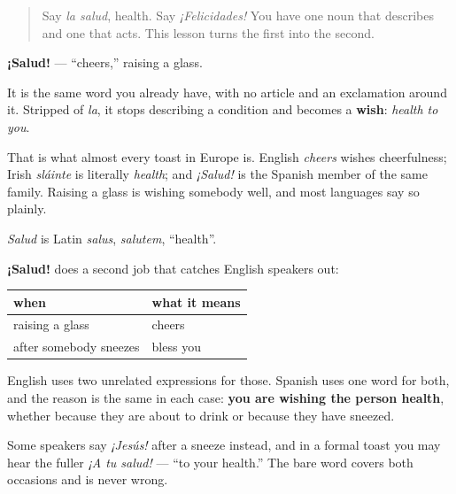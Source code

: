 \label{lesson:ES-C428-salud-brindis}



\begin{quote}
Say \emph{la salud}, health. Say \emph{¡Felicidades!} You have one noun that describes and one that acts. This lesson turns the first into the second.
\end{quote}

\begin{cousinweb}
\textbf{¡Salud!} — \textquotedblleft{}cheers,\textquotedblright{} raising a glass.

It is the same word you already have, with no article and an exclamation around it. Stripped of \emph{la}, it stops describing a condition and becomes a \textbf{wish}: \emph{health to you}.

That is what almost every toast in Europe is. English \emph{cheers} wishes cheerfulness; Irish \emph{sláinte} is literally \emph{health}; and \emph{¡Salud!} is the Spanish member of the same family. Raising a glass is wishing somebody well, and most languages say so plainly.

\emph{Salud} is Latin \emph{salus}, \emph{salutem}, \textquotedblleft{}health\textquotedblright{}.
\end{cousinweb}

\begin{grammarlens}[title={Grammar Lens: the same word, two occasions}]
\textbf{¡Salud!} does a second job that catches English speakers out:

\noindent
\begin{tabularx}{\linewidth}{@{}>{\raggedright\arraybackslash}X>{\raggedright\arraybackslash}X@{}}
\toprule
\textbf{when} & \textbf{what it means} \\
\midrule
raising a glass & cheers \\
after somebody sneezes & bless you \\
\bottomrule
\end{tabularx}

English uses two unrelated expressions for those. Spanish uses one word for both, and the reason is the same in each case: \textbf{you are wishing the person health}, whether because they are about to drink or because they have sneezed.

Some speakers say \emph{¡Jesús!} after a sneeze instead, and in a formal toast you may hear the fuller \emph{¡A tu salud!} — \textquotedblleft{}to your health.\textquotedblright{} The bare word covers both occasions and is never wrong.
\end{grammarlens}

